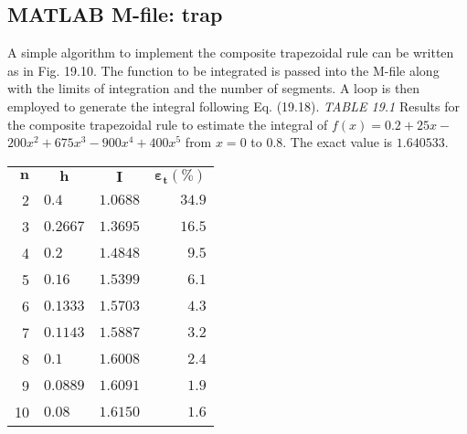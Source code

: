\documentclass[../main.tex]{subfiles}
\begin{document}
\subsection{MATLAB M-file: trap}

A simple algorithm to implement the composite trapezoidal rule can be written as in
Fig. 19.10. The function to be integrated is passed into the M-file along with the limits of
integration and the number of segments. A loop is then employed to generate the integral
following Eq. (19.18).
\textit{TABLE 19.1} Results for the composite trapezoidal rule to estimate the integral of $f(x)=0.2+25 x-$ $200 x^{2}+675 x^{3}-900 x^{4}+400 x^{5}$ from $x=0$ to $0.8$. The exact value is $1.640533$.
\begin{center}
\begin{tabular}{rlrr}
\hline $\boldsymbol{n}$ & \multicolumn{1}{c}{$\boldsymbol{h}$} & \multicolumn{1}{c}{$\boldsymbol{I}$} & $\boldsymbol{\varepsilon}_{\boldsymbol{t}}(\%)$ \\
2 & $0.4$ & $1.0688$ & $34.9$ \\
3 & $0.2667$ & $1.3695$ & $16.5$ \\
4 & $0.2$ & $1.4848$ & $9.5$ \\
5 & $0.16$ & $1.5399$ & $6.1$ \\
6 & $0.1333$ & $1.5703$ & $4.3$ \\
7 & $0.1143$ & $1.5887$ & $3.2$ \\
8 & $0.1$ & $1.6008$ & $2.4$ \\
9 & $0.0889$ & $1.6091$ & $1.9$ \\
10 & $0.08$ & $1.6150$ & $1.6$ \\
\hline
\end{tabular}
\end{center}
\end{document}
